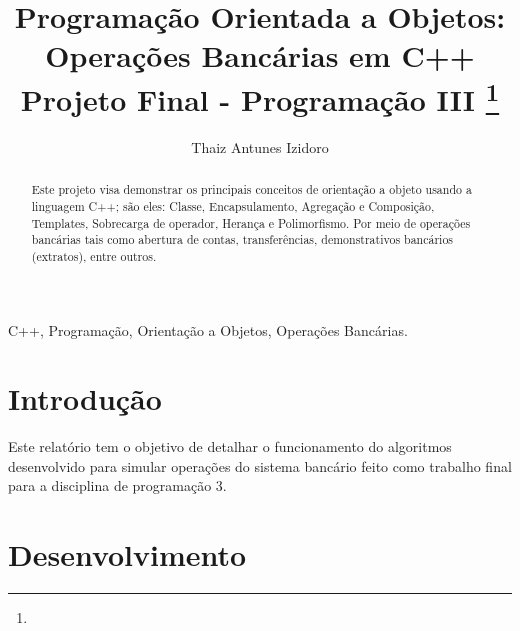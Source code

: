 \documentclass[conference]{IEEEtran}
\begin{document}
\title{Programação Orientada a Objetos: Operações Bancárias em C++\\
{\footnotesize Projeto Final - Programação III}
\thanks{}
}


\author{
\and
{Thaiz Antunes Izidoro}\\
}


\maketitle

\begin{abstract}
    Este projeto visa demonstrar os principais conceitos de orientação a objeto usando a linguagem C++; são eles: Classe, Encapsulamento, Agregação e Composição, Templates, Sobrecarga de operador, Herança e Polimorfismo. Por meio  de operações bancárias tais como abertura de contas, transferências, demonstrativos bancários (extratos), entre outros. 
\end{abstract}

\begin{IEEEkeywords}
    C++, Programação, Orientação a Objetos, Operações Bancárias.
\end{IEEEkeywords}

\section{Introdução}
Este relatório tem o objetivo de detalhar o funcionamento
do algoritmos desenvolvido para simular operações do sistema bancário feito como trabalho final
para a disciplina de programação 3.

\section{Desenvolvimento}
\end{document}
